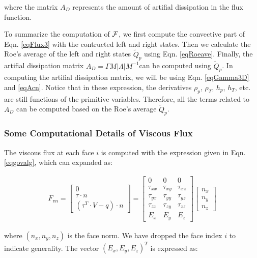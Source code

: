\documentclass[12pt, letterpaper]{report}
\begin{document}
where the matrix $A_D$ represents the amount of artifial dissipation in the flux function.
\paraspace

To summarize the computation of $\mathcal{F}$, we first compute the convective part of Eqn. \ref{eqFlux3}
with the contructed left and right states. Then we calculate the Roe's average of the left and right
states $\tilde{Q}_p$ using Eqn. \ref{eqRoeave}. Finally, the artifial dissipation matrix
$A_D = \Gamma M |\Lambda| M^{-1}$can be computed using $\tilde{Q}_p$. In computing the
artifial dissipation matrix, we will be using Eqn. \ref{eqGamma3D} and \ref{eqAcn}. Notice that
in these expression, the derivatives $\rho_p$, $\rho_T$, $h_p$, $h_T$, etc. are still functions of
the primitive variables. Therefore, all the terms related to $A_D$ can be computed based
on the Roe's average $\tilde{Q}_p$.

\subsubsection{Some Computational Details of Viscous Flux}

The viscous flux at each face $i$ is computed with the expression given in Eqn. \ref{eqgovalg},
which can expanded as:

\begin{align}\label{eqFvnexpand}
   F_{vn} = \begin{bmatrix}0 \\ \tau \cdot n \\ (\tau^T \cdot V - q) \cdot n\end{bmatrix} = \begin{bmatrix}
      0 & 0 & 0 \\
      \tau_{xx} & \tau_{xy} & \tau_{xz} \\
      \tau_{yx} & \tau_{yy} & \tau_{yz} \\
      \tau_{zx} & \tau_{zy} & \tau_{zz} \\
      E_x & E_y & E_z
      \end{bmatrix} \begin{bmatrix}n_x \\ n_y \\ n_z\end{bmatrix}
\end{align}

where $(n_x, n_y, n_z)$ is the face norm. We have dropped the face index $i$ to indicate generality.
The vector $(E_x, E_y, E_z)^T$ is expressed as:
\end{document}

